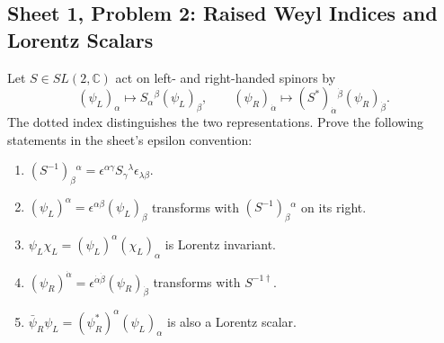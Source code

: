 \subsection{Sheet 1, Problem 2: Raised Weyl Indices and Lorentz Scalars}

Let $S\in SL(2,\mathbb C)$ act on left- and right-handed spinors by
\begin{equation}
    (\psi_L)_\alpha\longmapsto S_\alpha{}^\beta(\psi_L)_\beta,
    \qquad
    (\psi_R)_{\dot\alpha}
    \longmapsto (S^*)_{\dot\alpha}{}^{\dot\beta}
    (\psi_R)_{\dot\beta}.
\end{equation}
The dotted index distinguishes the two representations. Prove the
following statements in the sheet's epsilon convention:
\begin{enumerate}[label=\roman*)]
    \item $(S^{-1})_\beta{}^\alpha
    =\epsilon^{\alpha\gamma}S_\gamma{}^\lambda
    \epsilon_{\lambda\beta}$.
    \item $(\psi_L)^\alpha=\epsilon^{\alpha\beta}(\psi_L)_\beta$
    transforms with $(S^{-1})_\beta{}^\alpha$ on its right.
    \item $\psi_L\chi_L=(\psi_L)^\alpha(\chi_L)_\alpha$
    is Lorentz invariant.
    \item $(\psi_R)^{\dot\alpha}
    =\epsilon^{\dot\alpha\dot\beta}(\psi_R)_{\dot\beta}$
    transforms with $S^{-1\dagger}$.
    \item $\bar\psi_R\psi_L
    =(\psi_R^*)^\alpha(\psi_L)_\alpha$
    is also a Lorentz scalar.
\end{enumerate}
